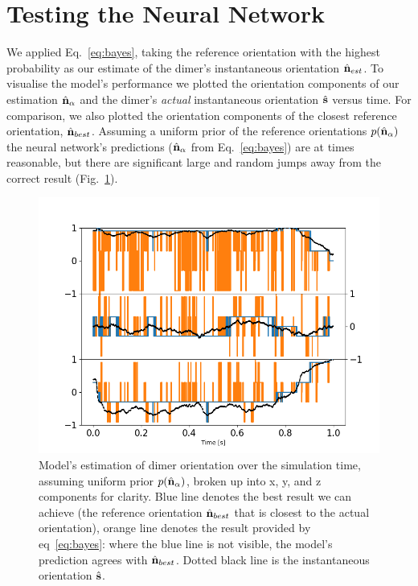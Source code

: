 \section{Testing the Neural Network}
\label{sec:test}
We applied Eq.~\eqref{eq:bayes}, taking the reference orientation 
with the highest probability  as our estimate of the dimer's 
instantaneous orientation $\hat{\bf n}_{est}$. To visualise the 
model's performance we plotted the orientation components of our 
estimation $\hat{\bf n}_{\alpha}$ and the dimer's \emph{actual} 
instantaneous orientation $\hat{\bf s}$ versus time. For comparison, 
we also plotted the orientation components of the closest reference orientation, $\hat{\bf n}_{best}$. Assuming a uniform prior of the 
reference orientations $p(\hat{\bf n}_\alpha)$ the neural network's predictions ($\hat{\bf n}_{\alpha}$ from Eq.~\eqref{eq:bayes}) are 
at times reasonable, but there are significant large and random jumps 
away from the correct result (Fig.~\ref{fig:uniform}). 
\begin{figure}[h!]
	\centering
	\includegraphics[width=\textwidth]{fig5.png}
	\caption{Model's estimation of dimer orientation over the simulation time, assuming uniform prior $p(\hat{\bf n}_\alpha)$, broken up into x, y, and z components for clarity. Blue line denotes the best result we can achieve (the reference orientation $\hat{\bf n}_{best}$ that is closest to the actual orientation), orange line denotes the result provided by eq~\ref{eq:bayes}: where the blue line is not visible, the model's prediction agrees with $\hat{\bf n}_{best}$. Dotted black line is the instantaneous orientation $\hat{\bf s}$.}
	\label{fig:uniform}
\end{figure} 

